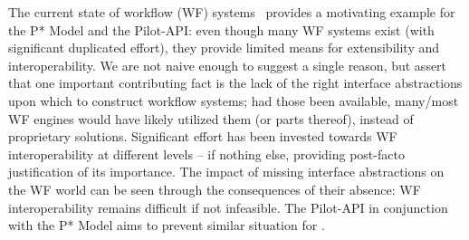 \documentclass[conference]{IEEEtran}
\begin{document}
The current state of workflow (WF) systems~\cite{nsf-workflow,1196459}
provides a motivating example for the P* Model and the Pilot-API:
even though many WF systems exist (with significant duplicated
effort), they provide limited means for extensibility and
interoperability.  We are not naive enough to suggest a single reason,
but assert that one important contributing fact is the lack of the
right interface abstractions upon which to construct workflow systems;
had those been available, many/most WF engines would have likely
utilized them (or parts thereof), instead of proprietary solutions.
%
%
Significant effort has been invested towards WF interoperability at
different levels -- if nothing else, providing post-facto
justification of its importance. The impact of missing interface
abstractions on the WF world can be seen through the consequences of
their absence: WF interoperability remains difficult if not
infeasible. The Pilot-API in conjunction with the P* Model aims to
prevent similar situation for \pilotjobs.



% 

\end{document}
